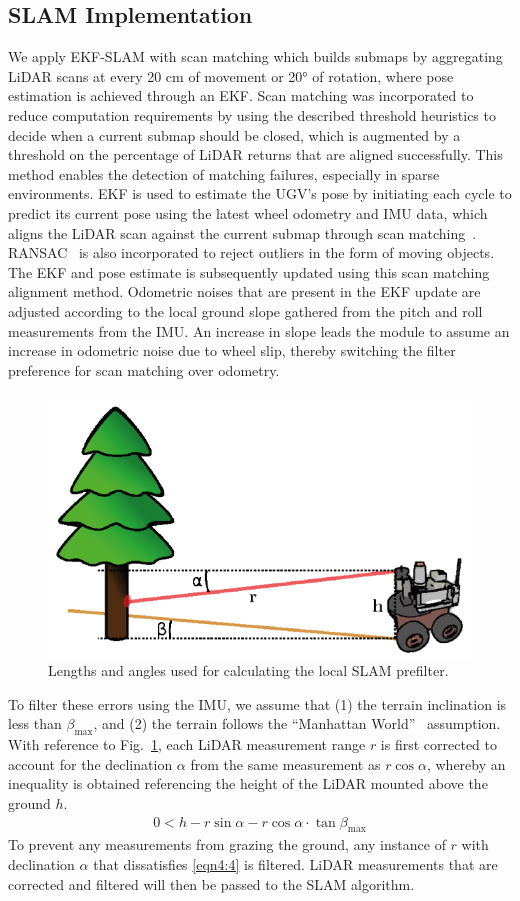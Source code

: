 \subsection{SLAM Implementation}
We apply EKF-SLAM with scan matching which builds submaps by aggregating LiDAR scans at every 20 cm of movement or \ang{20} of rotation, where pose estimation is achieved through an EKF. Scan matching was incorporated to reduce computation requirements by using the described threshold heuristics to decide when a current submap should be closed, which is augmented by a threshold on the percentage of LiDAR returns that are aligned successfully. This method enables the detection of matching failures, especially in sparse environments. EKF is used to estimate the UGV’s pose by initiating each cycle to predict its current pose using the latest wheel odometry and IMU data, which aligns the LiDAR scan against the current submap through scan matching~\cite{censi_accurate_2007}. RANSAC~\cite{martin_a._fischler_random_1981} is also incorporated to reject outliers in the form of moving objects. The EKF and pose estimate is subsequently updated using this scan matching alignment method. Odometric noises that are present in the EKF update are adjusted according to the local ground slope gathered from the pitch and roll measurements from the IMU. An increase in slope leads the module to assume an increase in odometric noise due to wheel slip, thereby switching the filter preference for scan matching over odometry.

\begin{figure}[H]
	\centering
	\includegraphics[width=0.6\linewidth]{fig4}
	\caption{Lengths and angles used for calculating the local SLAM prefilter.}
	\label{fig:4:slampf}
\end{figure}

To filter these errors using the IMU, we assume that (1) the terrain inclination is less than $\beta_\mathrm{max}$, and (2) the terrain follows the “Manhattan World”~\cite{coughlan_manhattan_2003} assumption. With reference to Fig.~\ref{fig:4:slampf}, each LiDAR measurement range $r$ is first corrected to account for the declination $\alpha$ from the same measurement as $r\cos\alpha$, whereby an inequality is obtained referencing the height of the LiDAR mounted above the ground $h$.
\begin{align}\label{eqn4:4}
0 < h - r\sin\alpha - r\cos\alpha \cdot \tan\beta_\mathrm{max}
\end{align}
To prevent any measurements from grazing the ground, any instance of $r$ with declination $\alpha$ that dissatisfies \eqref{eqn4:4} is filtered. LiDAR measurements that are corrected and filtered will then be passed to the SLAM algorithm.

